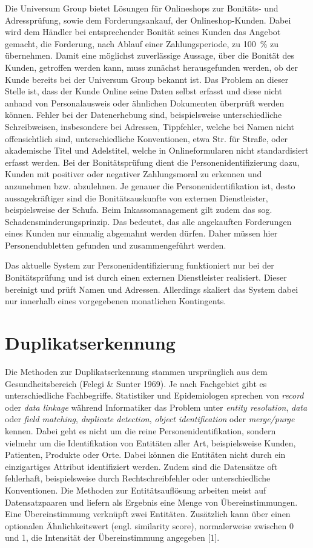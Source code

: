 \documentclass[%
	paper=A4,					%
	twoside=true,				%
	openright,					%
	parskip=full,				%
	chapterprefix=true,			%
	11pt,						%
	headings=normal,			%
	bibliography=totoc,			%
	listof=totoc,				%
	titlepage=on,				%
	captions=tableabove,		%
	draft=false,				%
]{scrreprt}%
\begin{document}
Die Universum Group bietet Lösungen für Onlineshops zur Bonitäts- und
Adressprüfung, sowie dem Forderungsankauf, der Onlineshop-Kunden. Dabei
wird dem Händler bei entsprechender Bonität seines Kunden das Angebot
gemacht, die Forderung, nach Ablauf einer Zahlungsperiode, zu 100~\% zu
übernehmen. Damit eine möglichst zuverlässige Aussage, über die Bonität
des Kunden, getroffen werden kann, muss zunächst herausgefunden werden,
ob der Kunde bereits bei der Universum Group bekannt ist. Das Problem an
dieser Stelle ist, dass der Kunde Online seine Daten selbst erfasst und
diese nicht anhand von Personalausweis oder ähnlichen Dokumenten
überprüft werden können. Fehler bei der Datenerhebung sind,
beispielsweise unterschiedliche Schreibweisen, insbesondere bei
Adressen, Tippfehler, welche bei Namen nicht offensichtlich sind,
unterschiedliche Konventionen, etwa Str. für Straße, oder akademische
Titel und Adelstitel, welche in Onlineformularen nicht standardisiert
erfasst werden. Bei der Bonitätsprüfung dient die
Personenidentifizierung dazu, Kunden mit positiver oder negativer
Zahlungsmoral zu erkennen und anzunehmen bzw. abzulehnen. Je genauer die
Personenidentifikation ist, desto aussagekräftiger sind die
Bonitätsauskunfte von externen Dienstleister, beispielsweise der Schufa.
Beim Inkassomanagement gilt zudem das sog. Schadensminderungsprinzip.
Das bedeutet, das alle angekauften Forderungen eines Kunden nur einmalig
abgemahnt werden dürfen. Daher müssen hier Personendubletten gefunden
und zusammengeführt werden.

Das aktuelle System zur Personenidentifizierung funktioniert nur bei der
Bonitätsprüfung und ist durch einen externen Dienstleister realisiert.
Dieser bereinigt und prüft Namen und Adressen. Allerdings skaliert das
System dabei nur innerhalb eines vorgegebenen monatlichen Kontingents.

\chapter{Duplikatserkennung}\label{duplikatserkennung}

Die Methoden zur Duplikatserkennung stammen ursprünglich aus dem
Gesundheitsbereich (Felegi \& Sunter 1969). Je nach Fachgebiet gibt es
unterschiedliche Fachbegriffe. Statistiker und Epidemiologen sprechen
von \emph{record} oder \emph{data linkage} während Informatiker das
Problem unter \emph{entity resolution}, \emph{data} oder \emph{field
matching}, \emph{duplicate detection}, \emph{object identification} oder
\emph{merge/purge} kennen. Dabei geht es nicht um die reine
Personenidentifikation, sondern vielmehr um die Identifikation von
Entitäten aller Art, beispielsweise Kunden, Patienten, Produkte oder
Orte. Dabei können die Entitäten nicht durch ein einzigartiges Attribut
identifiziert werden. Zudem sind die Datensätze oft fehlerhaft,
beispielsweise durch Rechtschreibfehler oder unterschiedliche
Konventionen. Die Methoden zur Entitätsauflösung arbeiten meist auf
Datensatzpaaren und liefern als Ergebnis eine Menge von
Übereinstimmungen. Eine Übereinstimmung verknüpft zwei Entitäten.
Zusätzlich kann über einen optionalen Ähnlichkeitswert (engl. similarity
score), normalerweise zwischen 0 und 1, die Intensität der
Übereinstimmung angegeben {[}1{]}.
\end{document}
